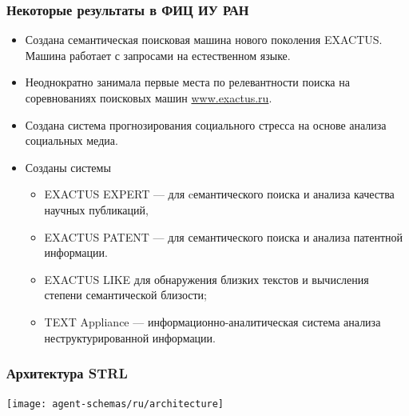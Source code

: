 \documentclass[default]{beamer}
\begin{document}
	\begin{frame}
		\frametitle{Некоторые результаты в ФИЦ ИУ РАН}
		
		\begin{itemize}
			\item Создана семантическая поисковая машина нового поколения EXACTUS.  Машина работает с запросами на естественном языке.
			\item Неоднократно занимала первые места по релевантности поиска на соревнованиях поисковых 	машин \href{www.exactus.ru}{www.exactus.ru}.
			\item Создана система прогнозирования социального стресса на основе анализа социальных медиа.
			\item Созданы системы
			\begin{itemize}
				\item EXACTUS EXPERT --- для cемантического поиска и анализа качества научных публикаций,
				\item EXACTUS PATENT --- для семантического поиска и анализа патентной информации.
				\item EXACTUS LIKE для обнаружения близких текстов и вычисления степени семантической близости;
				\item TEXT Appliance --- информационно-аналитическая система анализа неструктурированной информации.
			\end{itemize}
		\end{itemize}
	\end{frame}

	\begin{frame}
		\frametitle{Архитектура STRL}
		\centering
		\texttt{[image: agent-schemas/ru/architecture]}
	\end{frame}
	
\end{document}
